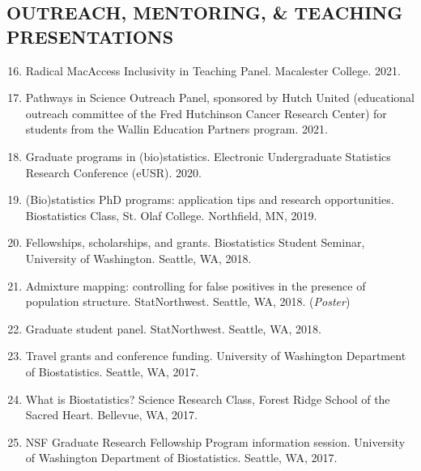 \documentclass[margin]{res}
\newenvironment{benumerate}[1]{
    \let\oldItem\item
    \def\item{\addtocounter{enumi}{-2}\oldItem}
    
    \begin{enumerate}
    \setcounter{enumi}{#1}
    \addtocounter{enumi}{1}
}{
    \end{enumerate}
}
\begin{document}
\begin{resume}
\section{OUTREACH, MENTORING, \& TEACHING \\ PRESENTATIONS}

\begin{benumerate}{15}


\item Radical MacAccess Inclusivity in Teaching Panel. Macalester College. 2021.

\item Pathways in Science Outreach Panel, sponsored by Hutch United (educational outreach committee of the Fred Hutchinson Cancer Research Center) for students from the Wallin Education Partners program. 2021.

\item Graduate programs in (bio)statistics. Electronic Undergraduate Statistics Research Conference (eUSR). 2020.

\item (Bio)statistics PhD programs: application tips and research opportunities. Biostatistics Class, St. Olaf College. Northfield, MN, 2019.

\item Fellowships, scholarships, and grants. Biostatistics Student Seminar, University of Washington. Seattle, WA, 2018.

\item %
Admixture mapping: controlling for false positives in the presence of population structure. StatNorthwest. Seattle, WA, 2018. (\textit{Poster})

\item Graduate student panel. StatNorthwest. Seattle, WA, 2018.

\item %
Travel grants and conference funding. University of Washington Department of Biostatistics. Seattle, WA, 2017.

\item %
What is Biostatistics? Science Research Class, Forest Ridge School of the Sacred Heart. Bellevue, WA, 2017.

\item %
NSF Graduate Research Fellowship Program information session. University of Washington Department of Biostatistics. Seattle, WA, 2017.


\end{benumerate}
\end{resume}
\end{document}
